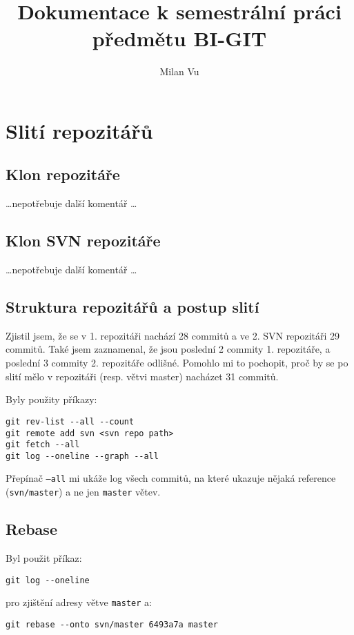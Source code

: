 \documentclass[titlepage]{article}
\title{Dokumentace k semestrální práci předmětu BI-GIT}
\author{Milan Vu}
\begin{document}
\maketitle



\section{Slití repozitářů}
\subsection{Klon repozitáře}
\ldots nepotřebuje další komentář \ldots


\subsection{Klon SVN repozitáře}
\ldots nepotřebuje další komentář \ldots

\subsection{Struktura repozitářů a postup slití}
Zjistil jsem, že se v 1. repozitáři nachází 28 commitů a ve 2. SVN repozitáři 29 commitů.
Také jsem zaznamenal, že jsou poslední 2 commity 1. repozitáře, a poslední 3 commity 2. repozitáře odlišné.
Pomohlo mi to pochopit, proč by se po slití mělo v repozitáři (resp. větvi master) nacházet 31 commitů.

Byly použity příkazy:

\begin{verbatim}
git rev-list --all --count
git remote add svn <svn repo path>
git fetch --all
git log --oneline --graph --all
\end{verbatim}

Přepínač \texttt{--all} mi ukáže log všech commitů, na které ukazuje nějaká reference (\texttt{svn/master}) a ne jen \texttt{master} větev.

\subsection{Rebase}
Byl použit příkaz:

\begin{verbatim}
git log --oneline
\end{verbatim}

pro zjištění adresy větve \texttt{master} a:

\begin{verbatim}
git rebase --onto svn/master 6493a7a master
\end{verbatim}
\end{document}

